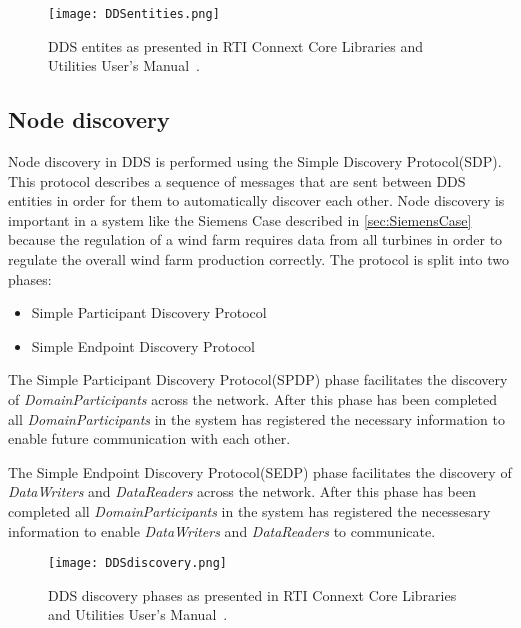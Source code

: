 \begin{figure}
	\centering
	\texttt{[image: DDSentities.png]} 
	\caption[DDS entities]{
		\label{fig:ddsEntities} 
		\footnotesize{%
			DDS entites as presented in RTI Connext Core Libraries and Utilities User's Manual~\cite{rtiConnextUsersManual}.
		}
	}
\end{figure}

\subsection{Node discovery}
Node discovery in DDS is performed using the Simple Discovery Protocol(SDP).
This protocol describes a sequence of messages that are sent between DDS entities in order for them to automatically discover each other.
Node discovery is important in a system like the Siemens Case described in \cref{sec:SiemensCase} because the regulation of a wind farm requires data from all turbines in order to regulate the overall wind farm production correctly.
The protocol is split into two phases:

\begin{itemize}
	\item Simple Participant Discovery Protocol
	\item Simple Endpoint Discovery Protocol
\end{itemize}

The Simple Participant Discovery Protocol(SPDP) phase facilitates the discovery of \textit{DomainParticipants} across the network.
After this phase has been completed all \textit{DomainParticipants} in the system has registered the necessary information to enable future communication with each other.

The Simple Endpoint Discovery Protocol(SEDP) phase facilitates the discovery of \textit{DataWriters} and \textit{DataReaders} across the network.
After this phase has been completed all \textit{DomainParticipants} in the system has registered the necessesary information to enable \textit{DataWriters} and \textit{DataReaders} to communicate.

\begin{figure}
	\centering
	\texttt{[image: DDSdiscovery.png]} 
	\caption[DDS discovery phases]{
		\label{fig:DDSdiscovery} 
		\footnotesize{%
			DDS discovery phases as presented in RTI Connext Core Libraries and Utilities User's Manual~\cite{rtiConnextUsersManual}.
		}
	}
\end{figure}

